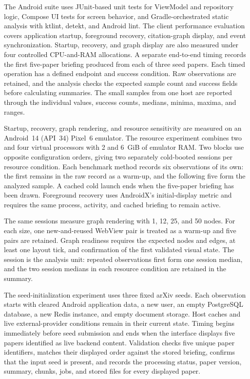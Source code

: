 The Android suite uses JUnit-based unit tests for ViewModel and repository
logic, Compose UI tests for screen behavior, and Gradle-orchestrated static
analysis with ktlint, detekt, and Android lint. The client performance
evaluation covers application startup, foreground recovery, citation-graph
display, and event synchronization. Startup, recovery, and graph display are
also measured under four controlled CPU-and-RAM allocations. A separate
end-to-end timing records the first five-paper briefing produced from each of
three seed papers. Each timed operation has a defined endpoint and success
condition.
Raw observations are retained, and the analysis checks the expected sample
count and success fields before calculating summaries. The small samples from
one host are reported through the individual values, success counts, medians,
minima, maxima, and ranges.

Startup, recovery, graph rendering, and resource sensitivity are measured on
an Android~14 (API~34) Pixel~6 emulator. The resource experiment combines two
and four virtual processors with 2 and 6~GiB of emulator RAM. Two blocks use
opposite configuration orders, giving two separately cold-booted sessions per
resource condition. Each benchmark method records six observations of its
own: the first remains in the raw record as a warm-up, and the following five
form the analyzed sample. A cached cold
launch ends when the five-paper briefing has been drawn. Foreground recovery
uses AndroidX's initial-display metric and requires the same process, activity,
and cached briefing to remain active.

The same sessions measure graph rendering with 1, 12, 25, and 50 nodes. For
each size, one new-and-reused WebView pair is treated as a warm-up and five
pairs are retained. Graph readiness requires the expected nodes and edges, at
least one layout tick, and confirmation of the first validated visual state.
The session is the analysis unit: repeated observations first form one session
median, and the two session medians in each resource condition are retained in
the summary.

The seed-initialization experiment uses three fixed arXiv seeds. Each
observation starts with cleared Android application data, a new user, an empty
PostgreSQL database, a new Redis instance, and empty document storage. Host
caches and live external-provider conditions remain in their current state.
Timing begins immediately before seed submission and ends when the interface
displays five papers identified as live backend content. Validation checks five
unique paper identifiers, matches their displayed order against the stored
briefing, confirms that the input seed is present, and records the processing
status, paper version, summary, chunks, jobs, and stored files for every
displayed paper.

